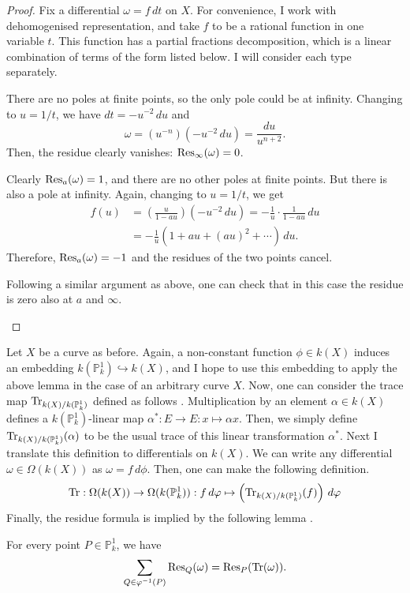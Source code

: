 \begin{proof}
  Fix a differential $\omega=f\,dt$ on $X$. For convenience, I work with
  dehomogenised representation, and take $f$ to be a rational function
  in one variable $t$. This function has a partial fractions decomposition,
  which is a linear combination of terms of the form listed below. I will
  consider each type separately.
  \begin{description}[style=nextline]
    \item[Term of type $\omega=t^{n}\,dt$:] There are no poles at finite
          points, so the only pole could be at infinity. Changing to
          $u=1/t$, we have $dt=-u^{-2}\,du$ and
          \[\omega=(u^{-n})(-u^{-2}\,du)=\frac{du}{u^{n+2}}.\]
          Then, the residue clearly vanishes: $\operatorname{Res}_{\infty}(\omega)=0$.
    \item[Term of type $\omega=\frac{dt}{t-a}$:] Clearly $\operatorname{Res}_{a}(\omega)=1$,
          and there are no other poles at finite points. But there is also a
          pole at infinity. Again, changing to $u=1/t$, we get
          \begin{align*}
            f(u)&=\left(\frac{u}{1-au}\right)(-u^{-2}\,du)
            =-\frac1{u}\cdot\frac1{1-au}\,du \\
            &=-\frac1{u}\left(1+au+(au)^{2}+\cdots\right)\,du.
          \end{align*}
          Therefore, $\operatorname{Res}_{a}(\omega)=-1$ and the residues of the two points
          cancel.
    \item[Term of type $\omega=\frac{dt}{(t-a)^{n}}$ for $n>1$:] Following
          a similar argument as above, one can check that in this case
          the residue is zero also at $a$ and $\infty$.
  \end{description}
\end{proof}
Let $X$ be a curve as before. Again, a non-constant function $\phi\in k(X)$
induces an embedding $k(\mathbb{P}^{1}_{k})\hookrightarrow k(X)$, and I hope
to use this embedding to apply the above lemma in the case of an arbitrary
curve $X$. Now, one can consider the trace map $\operatorname{Tr}_{k(X)/k(\mathbb{P}^{1}_{k})}$
defined as follows \cite{milne}. Multiplication by an element
$\alpha\in k(X)$ defines a $k(\mathbb{P}^{1}_{k})$-linear map
$\alpha^{\ast}: E\to E: x\mapsto \alpha x$. Then, we simply define
$\operatorname{Tr}_{k(X)/k(\mathbb{P}^{1}_{k})}(\alpha)$ to be the usual trace of this linear
transformation $\alpha^{\ast}$. Next I translate this definition to
differentials on $k(X)$. We can write any differential
$\omega\in\Omega(k(X))$ as $\omega=f\,d\phi$. Then, one can make the
following definition.
\[
  \operatorname{Tr}:\Omega(k(X))\to \Omega(k(\mathbb{P}^{1}_{k}))
  :f\,d\varphi\mapsto \left(\operatorname{Tr}_{k(X)/k(\mathbb{P}^{1}_{k})}(f)\right)\,d\varphi
\]
Finally, the residue formula is implied by the following lemma
\cite{serre}.
\begin{lemm}
  For every point $P\in\mathbb{P}^{1}_{k}$, we have
  \[
    \sum_{Q\in\varphi^{-1}(P)}\operatorname{Res}_{Q}(\omega)=\operatorname{Res}_{P}(\operatorname{Tr}(\omega)).
  \]
\end{lemm}

